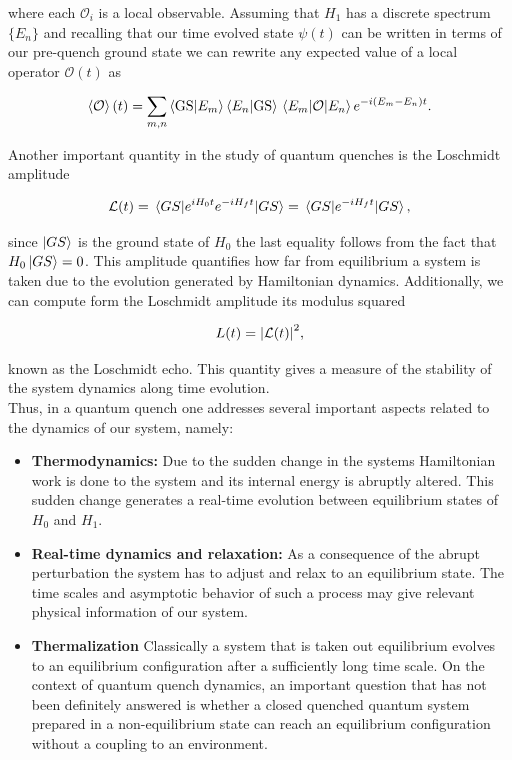 where each $\mathcal{O}_i$ is a local observable. Assuming that $H_1$ has a discrete spectrum $\{E_n\}$ and recalling that our time evolved state $ \psi(t)$ can be written in terms of our pre-quench ground state we can rewrite any expected value of a local operator $\mathcal{O}(t)$ as

\begin{equation}
\expval{\mathcal{O}}(t) = \sum_{m,n}\ip{\textrm{GS}}{E_m}\ip{E_n}{\textrm{GS}}\mel{E_m}{\mathcal{O}}{E_n}e^{-i (E_m-E_n)t}.
\label{eq:expvalobs1}
\end{equation}

Another important quantity in the study of quantum quenches is the Loschmidt amplitude

\begin{equation}
\mathcal{L}(t) = \ev{e^{iH_0 t}e^{-iH_f t}}{GS}=\ev{e^{-iH_f t}}{GS},
\end{equation}

since $\ket{GS}$ is the ground state of $H_0$ the last equality follows from the fact that $H_0\ket{GS}=0$. This amplitude quantifies how far from equilibrium a system is taken due to the evolution generated by Hamiltonian dynamics. Additionally, we can compute form the Loschmidt amplitude its modulus squared

\begin{equation}
L(t) = \abs{\mathcal{L}(t)}^2,
\end{equation}

known as the Loschmidt echo. This quantity gives a measure of the stability of the system dynamics along time evolution.\\

Thus, in a quantum quench one addresses several important aspects related to the dynamics of our system, namely:

\begin{itemize}
	\item \textbf{Thermodynamics:} Due to the sudden change in the systems Hamiltonian work is done to the system and its internal energy is abruptly altered. This sudden change generates a real-time evolution between equilibrium states of $H_0$ and $H_1$.
	\item \textbf{Real-time dynamics and relaxation:} As a consequence of the abrupt perturbation the system has to adjust and relax to an equilibrium state. The time scales and asymptotic behavior of such a process may give relevant physical information of our system.
	\item \textbf{Thermalization} Classically a system that is taken out equilibrium evolves to an equilibrium configuration after a sufficiently long time scale. On the context of quantum quench dynamics, an important question that has not been definitely answered is whether a closed quenched quantum system prepared in a non-equilibrium state can reach an equilibrium configuration without a coupling to an environment.
\end{itemize}

